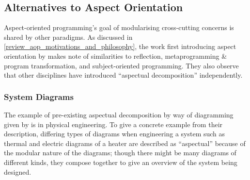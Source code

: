 \subsection{Alternatives to Aspect Orientation}

Aspect-oriented programming's goal of modularising cross-cutting concerns is
shared by other paradigms. As discussed in
\cref{review_aop_motivations_and_philosophy}, the work first introducing aspect
orientation by \citet{kiczales1997aspect} makes note of similarities to
reflection, metaprogramming \& program transformation, and subject-oriented
programming. They also observe that other disciplines have introduced
``aspectual decomposition'' independently.


\subsubsection{System Diagrams}\label{subsec:system_diagrams_as_aspects}

The example of pre-existing aspectual decomposition by way of diagramming given
by \citet{kiczales1997aspect} is in physical engineering. To give a concrete
example from their description, differing types of diagrams when engineering a
system such as thermal and electric diagrams of a heater are described as
``aspectual'' because of the modular nature of the diagrams; though there might
be many diagrams of different kinds, they compose together to give an overview
of the system being designed.

